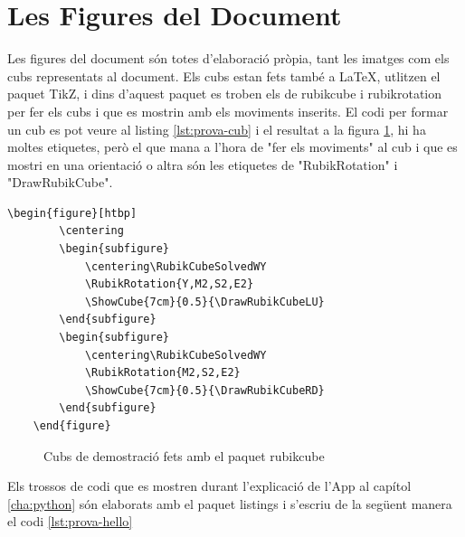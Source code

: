 \section{Les Figures del Document}

Les figures del document són totes d'elaboració pròpia, tant les imatges com els cubs representats al document. 
Els cubs estan fets també a LaTeX, utlitzen el paquet TikZ, i dins d'aquest paquet es troben els de rubikcube i rubikrotation per fer els cubs i que es mostrin amb els moviments inserits.
El codi per formar un cub es pot veure al listing \ref{lst:prova-cub} i el resultat a la figura \ref{fig:cubs-latex}, hi ha moltes etiquetes, però el que mana a l'hora de "fer els moviments" al cub i que es mostri en una orientació o altra són les etiquetes de "RubikRotation" i "DrawRubikCube". 


\begin{lstlisting}[style=latex, caption={Exemple de Cubs fets amb el paquet rubikcube}, label={lst:prova-cub}]
    \begin{figure}[htbp]
        \centering
        \begin{subfigure}
            \centering\RubikCubeSolvedWY
            \RubikRotation{Y,M2,S2,E2}
            \ShowCube{7cm}{0.5}{\DrawRubikCubeLU}
        \end{subfigure}
        \begin{subfigure}
            \centering\RubikCubeSolvedWY
            \RubikRotation{M2,S2,E2}
            \ShowCube{7cm}{0.5}{\DrawRubikCubeRD}
        \end{subfigure}
    \end{figure}
\end{lstlisting}

\begin{figure}[htbp]
    \centering
    \begin{subfigure}
        \centering\RubikCubeSolvedWY
    \end{subfigure}
    \begin{subfigure}
        \centering\RubikCubeSolvedWY
    \end{subfigure}
    \caption{Cubs de demostració fets amb el paquet rubikcube}
    \label{fig:cubs-latex}
\end{figure}


Els trossos de codi que es mostren durant l'explicació de l'App al capítol \ref{cha:python} són elaborats amb el paquet listings i s'escriu de la següent manera el codi \ref{lst:prova-hello}

